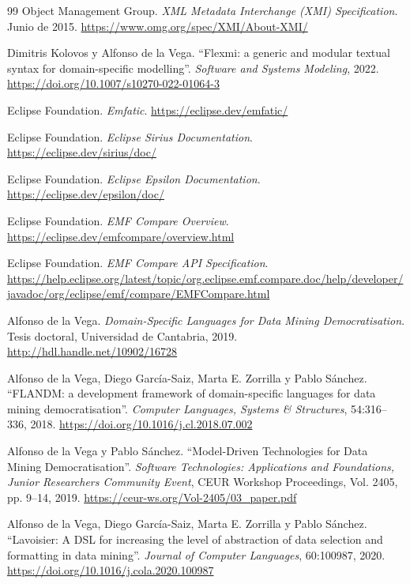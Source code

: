 \documentclass[11pt]{article}
\begin{document}
\begin{thebibliography}{99}
Object Management Group.
\textit{XML Metadata Interchange (XMI) Specification}.
Junio de 2015.
\url{https://www.omg.org/spec/XMI/About-XMI/}

Dimitris Kolovos y Alfonso de la Vega.
``Flexmi: a generic and modular textual syntax for domain-specific modelling''.
\textit{Software and Systems Modeling}, 2022.
\url{https://doi.org/10.1007/s10270-022-01064-3}

Eclipse Foundation.
\textit{Emfatic}.
\url{https://eclipse.dev/emfatic/}

Eclipse Foundation.
\textit{Eclipse Sirius Documentation}.
\url{https://eclipse.dev/sirius/doc/}

Eclipse Foundation.
\textit{Eclipse Epsilon Documentation}.
\url{https://eclipse.dev/epsilon/doc/}

Eclipse Foundation.
\textit{EMF Compare Overview}.
\url{https://eclipse.dev/emfcompare/overview.html}

Eclipse Foundation.
\textit{EMF Compare API Specification}.
\url{https://help.eclipse.org/latest/topic/org.eclipse.emf.compare.doc/help/developer/javadoc/org/eclipse/emf/compare/EMFCompare.html}

Alfonso de la Vega.
\textit{Domain-Specific Languages for Data Mining Democratisation}.
Tesis doctoral, Universidad de Cantabria, 2019.
\url{http://hdl.handle.net/10902/16728}

Alfonso de la Vega, Diego García-Saiz, Marta E. Zorrilla y Pablo Sánchez.
``FLANDM: a development framework of domain-specific languages for data mining democratisation''.
\textit{Computer Languages, Systems \& Structures}, 54:316--336, 2018.
\url{https://doi.org/10.1016/j.cl.2018.07.002}

Alfonso de la Vega y Pablo Sánchez.
``Model-Driven Technologies for Data Mining Democratisation''.
\textit{Software Technologies: Applications and Foundations, Junior Researchers Community Event}, CEUR Workshop Proceedings, Vol. 2405, pp. 9--14, 2019.
\url{https://ceur-ws.org/Vol-2405/03_paper.pdf}

Alfonso de la Vega, Diego García-Saiz, Marta E. Zorrilla y Pablo Sánchez.
``Lavoisier: A DSL for increasing the level of abstraction of data selection and formatting in data mining''.
\textit{Journal of Computer Languages}, 60:100987, 2020.
\url{https://doi.org/10.1016/j.cola.2020.100987}


\end{thebibliography}
\end{document}
